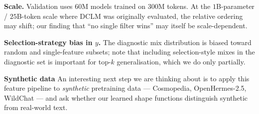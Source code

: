 \documentclass[twocolumn,letterpaper,10pt]{article}
\begin{document}
\textbf{Scale.} Validation uses $60$M models trained on $300$M
tokens. At the $1$B-parameter / $25$B-token scale where DCLM was
originally evaluated, the relative ordering may shift; our finding
that ``no single filter wins'' may itself be scale-dependent.

\textbf{Selection-strategy bias in $y$.} The diagnostic mix
distribution is biased toward random and single-feature subsets;
\citet{engstrom2024dsdm} note that including selection-style mixes in
the diagnostic set is important for top-$k$ generalisation, which we
do only partially.

\textbf{Synthetic data} An interesting next step we are thinking about is to apply this feature pipeline to
\emph{synthetic} pretraining data --- Cosmopedia, OpenHermes-2.5,
WildChat --- and ask whether our learned shape functions distinguish
synthetic from real-world text. 
\end{document}
